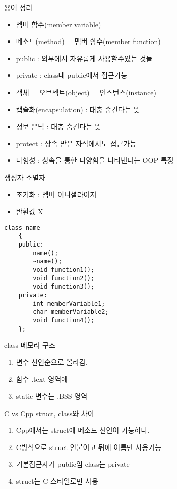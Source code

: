 \documentclass[10pt]{beamer}
\begin{document}
\begin{frame}{용어 정리}
    \begin{itemize}
        \item 멤버 함수(member variable)
        \item 메소드(method) = 멤버 함수(member function)
        \item public : 외부에서 자유롭게 사용할수있는 것들
        \item private : class내 public에서 접근가능
        \item 객체 = 오브젝트(object) = 인스턴스(instance)
        \item 캡슐화(encapsulation) : 대충 숨긴다는 뜻
        \item 정보 은닉 : 대충 숨긴다는 뜻
        \item protect : 상속 받은 자식에서도 접근가능
        \item 다형성 : 상속을 통한 다양함을 나타낸다는 OOP 특징
    \end{itemize}
\end{frame}    

\begin{frame}[fragile]{생성자 소멸자}
    \begin{itemize}
        \item 초기화 : 멤버 이니셜라이저
        \item 반환값 X
    \end{itemize}
    
    \begin{lstlisting}[style = CStyle]
    class name
    {
    public:
        name();
        ~name();
        void function1();
        void function2();
        void function3();
    private:
        int memberVariable1;
        char memberVariable2;
        void function4();
    };
    \end{lstlisting}
\end{frame}    


\begin{frame}{class 메모리 구조}
    \begin{enumerate}
        \item 변수 선언순으로 올라감.
        \item 함수 .text 영역에
        \item static 변수는 .BSS 영역
    \end{enumerate}
\end{frame}    

\begin{frame}{C vs Cpp struct, class와 차이}
    \begin{enumerate}
        \item Cpp에서는 struct에 메소드 선언이 가능하다.
        \item C방식으로 struct 안붙이고 뒤에 이름만 사용가능
        \item 기본접근자가 public임 class는 private
        \item struct는 C 스타일로만 사용
    \end{enumerate}
\end{frame}    
\end{document}
